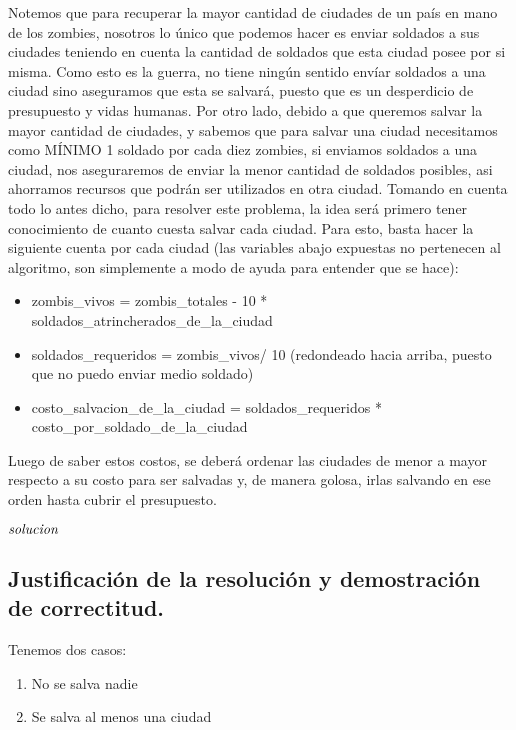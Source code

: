 Notemos que para recuperar la mayor cantidad de ciudades de un país en mano de los zombies, nosotros lo único que podemos hacer es enviar soldados a sus ciudades teniendo en cuenta la cantidad de soldados que esta ciudad posee por si misma. Como esto es la guerra, no tiene ningún sentido envíar soldados a una ciudad sino aseguramos que esta se salvará, puesto que es un desperdicio de presupuesto y vidas humanas. Por otro lado, debido a que queremos salvar la mayor cantidad de ciudades, y sabemos que para salvar una ciudad necesitamos como MÍNIMO 1 soldado por cada diez zombies, si enviamos soldados a una ciudad, nos aseguraremos de enviar la menor cantidad de soldados posibles, asi ahorramos recursos que podrán ser utilizados en otra ciudad. Tomando en cuenta todo lo antes dicho, para resolver este problema, la idea será primero tener conocimiento de cuanto cuesta salvar cada ciudad. Para esto, basta hacer la siguiente cuenta por cada ciudad (las variables abajo expuestas no pertenecen al algoritmo, son simplemente a modo de ayuda para entender que se hace):
\begin{itemize}
   \item  zombis_vivos = zombis_totales - 10 * soldados_atrincherados_de_la_ciudad
   \item  soldados_requeridos = zombis_vivos/ 10 (redondeado hacia arriba, puesto que no puedo enviar medio soldado)
   \item costo_salvacion_de_la_ciudad = soldados_requeridos * costo_por_soldado_de_la_ciudad  
\end{itemize}

Luego de saber estos costos, se deberá ordenar las ciudades de menor a mayor respecto a su costo para ser salvadas y, de manera golosa, irlas salvando en ese orden hasta cubrir el presupuesto.

\begin{codebox}
\li \Return $\id{solucion}$
\end{codebox}



\newpage
\subsection{Justificación de la resolución y demostración de correctitud.}

\vspace*{0.3cm}

Tenemos dos casos:
\begin{enumerate}
	\item No se salva nadie
	\item Se salva al menos una ciudad
\end{enumerate}

